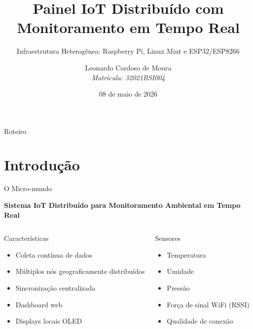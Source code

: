 \documentclass[12pt,aspectratio=16:9]{beamer}
\title{Painel IoT Distribuído com Monitoramento em Tempo Real}
\subtitle{Infraestrutura Heterogênea: Raspberry Pi, Linux Mint e ESP32/ESP8266}
\author{Leonardo Cardoso de Moura \\ \textit{Matrícula: 32021BSI004}}
\date{08 de maio de 2026}
\institute{Disciplina: Sistemas Distribuídos}
\begin{document}
\frame{\titlepage}

\begin{frame}{Roteiro}
    \tableofcontents
\end{frame}

\section{Introdução}

\begin{frame}{O Micro-mundo}
    \begin{center}
        \textbf{Sistema IoT Distribuído para Monitoramento Ambiental em Tempo Real}
    \end{center}
    
    \vspace{1cm}
    
    \begin{columns}
        \begin{block}{Características}
            \begin{itemize}
                \item Coleta contínua de dados
                \item Múltiplos nós geograficamente distribuídos
                \item Sincronização centralizada
                \item Dashboard web
                \item Displays locais OLED
            \end{itemize}
        \end{block}
        
        \begin{block}{Sensores}
            \begin{itemize}
                \item Temperatura
                \item Umidade
                \item Pressão
                \item Força de sinal WiFi (RSSI)
                \item Qualidade de conexão
            \end{itemize}
        \end{block}
    \end{columns}
\end{frame}
\end{document}
